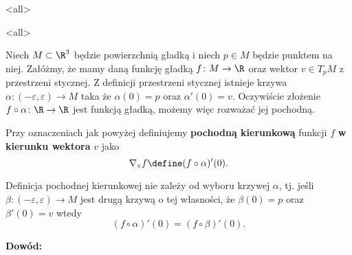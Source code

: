 \mode*
\mode<all>{}

\mode<all>{}

\begin{frame}

Niech $M\subset \R^3$ będzie powierzchnią gładką i niech $p\in M$ będzie punktem na niej. Załóżmy, że mamy daną funkcję gładką $f\colon M\to \R$ oraz wektor $v\in T_pM$ z przestrzeni stycznej. \pause Z definicji przestrzeni stycznej istnieje krzywa $\alpha\colon (-\varepsilon,\varepsilon)\to M$ taka że $\alpha(0)=p$ oraz $\alpha'(0)=v$. \pause Oczywiście złożenie $f\circ \alpha\colon \R\to \R$ jest funkcją gładką, możemy więc rozważać jej pochodną.

\pause \begin{definicja}
Przy oznaczeniach jak powyżej definiujemy \textbf{pochodną kierunkową} funkcji $f$ \textbf{w kierunku wektora} $v$ jako 
\[\nabla_vf\define (f\circ \alpha)'(0).\]
\end{definicja}

\end{frame}
\begin{frame}
\begin{lemat}
Definicja pochodnej kierunkowej nie zależy od wyboru krzywej $\alpha$, tj. jeśli $\beta\colon (-\varepsilon,\varepsilon)\to M$ jest drugą krzywą o tej własności, że $\beta(0)=p$ oraz $\beta'(0)=v$ wtedy \[\left(f\circ \alpha\right)'(0)=\left(f\circ \beta\right)'(0).\]
\end{lemat}
\textcolor{ared}{\textbf{Dowód: }}\\\pause
{}


\end{frame}
